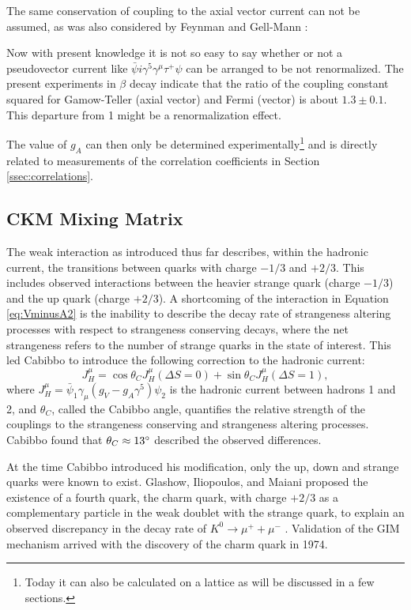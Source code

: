 The same conservation of coupling to the axial vector current can not be assumed, as was also 
considered by Feynman and Gell-Mann \cite{feynman1958}:
%
\begin{displayquote}
Now with present knowledge it is not so easy to say
whether or not a pseudovector current like
$\bar{\psi}i\gamma^5\gamma^\mu\tau^+\psi$
can be arranged to be not renormalized. The present
experiments in $\beta$ decay indicate that the ratio of the
coupling constant squared for Gamow-Teller (axial vector) and Fermi
(vector)
is about $1.3\pm0.1$. This departure from 1 might be a
renormalization effect.
\end{displayquote}
%
The value of $g_A$ can then only be determined experimentally\footnote{Today it can also be calculated on
  a lattice as will be discussed in a few sections.} and is directly related to measurements
of the correlation coefficients in Section \ref{ssec:correlations}.


\subsection{CKM Mixing Matrix}
The weak interaction as introduced thus far describes, within the hadronic current, the transitions
between quarks with charge $-1/3$ and $+2/3$. This includes observed interactions between the heavier
strange quark (charge $-1/3$) and the up quark (charge $+2/3$). 
A shortcoming of the interaction in Equation \ref{eq:VminusA2} is the inability to describe
the decay rate of strangeness altering processes with respect to strangeness conserving
decays, where the net strangeness refers to the number of strange quarks in the state of interest.
This led Cabibbo \cite{cabibbo1963} to introduce the following correction to the hadronic current:
%
\begin{equation}
  J^\mu_H = \cos\theta_C J^\mu_H(\Delta S=0) + \sin\theta_C J^\mu_H(\Delta S=1),
  \label{eq:cabibbo}
\end{equation}
%
where $J^\mu_H = \bar{\psi}_1 \gamma_\mu(g_V-g_A\gamma^5)\psi_2$ is the hadronic current between
hadrons 1 and 2, and $\theta_C$, called the Cabibbo angle, quantifies the relative strength
of the couplings to the strangeness conserving and strangeness altering processes.
Cabibbo found that $\theta_C \approx 13\degree$ described the observed differences.

At the time Cabibbo introduced his modification, only the up, down and strange quarks were known
to exist. Glashow, Iliopoulos, and Maiani proposed the existence of a fourth quark, the charm quark,
with charge $+2/3$ as a complementary particle in the weak doublet with the strange quark, to explain
an observed discrepancy in the decay rate of $K^0 \rightarrow \mu^+ + \mu^-$ \cite{glashow1970}.
Validation of the GIM mechanism arrived with the discovery of the
charm quark in 1974.

